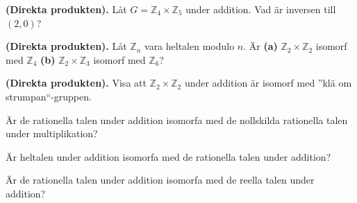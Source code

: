 \documentclass[11pt,fleqn]{book} %
\begin{document}
\begin{problem} \textbf{(Direkta produkten).} 
  Låt \(G = \mathbb{Z} _4 \times \mathbb{Z} _5\) under addition. Vad är inversen till \((2, 0)\)? 
\end{problem}


\begin{problem} \textbf{(Direkta produkten).} 
  Låt \(\mathbb{Z}_n \) vara heltalen modulo \(n\). Är \textbf{(a)} \(\mathbb{Z} _2 \times \mathbb{Z} _2\) isomorf med \(\mathbb{Z} _4\) \textbf{(b)} \(\mathbb{Z} _2 \times \mathbb{Z} _3\) isomorf med \(\mathbb{Z} _6\)? %
\end{problem}

\begin{problem} \textbf{(Direkta produkten).} 
  Visa att \(\mathbb{Z} _2 \times \mathbb{Z} _2\) under addition är isomorf med ''klä om strumpan``-gruppen.
\end{problem}



% 





\begin{problem} %
  Är de rationella talen under addition isomorfa med de nollskilda rationella talen under multiplikation?
\end{problem}

\begin{problem}
  Är heltalen under addition isomorfa med de rationella talen under addition?
\end{problem}

\begin{problem}
  Är de rationella talen under addition isomorfa med de reella talen under addition?
\end{problem}
\end{document}
